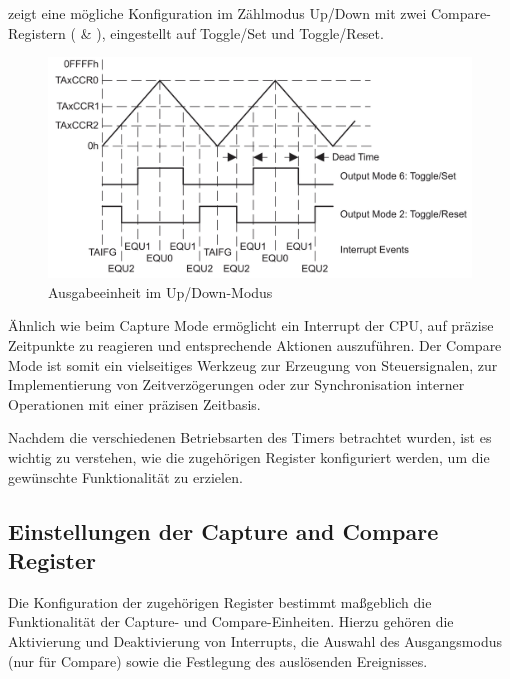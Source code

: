  zeigt eine m\"ogliche Konfiguration im Z\"ahlmodus Up/Down mit zwei Compare-Registern ( \& ), eingestellt auf Toggle/Set und Toggle/Reset.

\begin{figure}[h!]
	\centering
	\includegraphics[width=1.0\textwidth]{../Bilder/UpDown_ModeBsp.png}
	\caption{Ausgabeeinheit im Up/Down-Modus\\}
	\label{fig:OutputUnit_UpDown_Mode}
\end{figure}

\newpage
\"Ahnlich wie beim Capture Mode erm\"oglicht ein Interrupt der CPU, auf pr\"azise Zeitpunkte zu reagieren und entsprechende Aktionen auszuf\"uhren. Der Compare Mode ist somit ein vielseitiges Werkzeug zur Erzeugung von Steuersignalen, zur Implementierung von Zeitverz\"ogerungen oder zur Synchronisation interner Operationen mit einer pr\"azisen Zeitbasis. \\

Nachdem die verschiedenen Betriebsarten des Timers betrachtet wurden, ist es wichtig zu verstehen, wie die zugeh\"origen Register konfiguriert werden, um die gew\"unschte Funktionalit\"at zu erzielen.

\vspace{1.25cm}
\subsection{Einstellungen der Capture and Compare Register}
\label{sec:CC_Register}

Die Konfiguration der zugeh\"origen Register bestimmt ma{\ss}geblich die Funktionalit\"at der Capture- und Compare-Einheiten. Hierzu geh\"oren die Aktivierung und Deaktivierung von Interrupts, die Auswahl des Ausgangsmodus (nur f\"ur Compare) sowie die Festlegung des ausl\"osenden Ereignisses.

